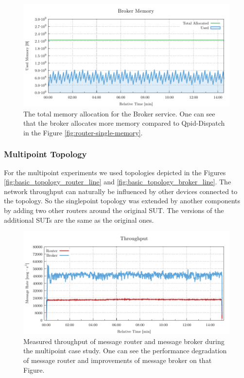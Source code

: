 \begin{figure}[H]
	\centering
	\includegraphics[width=1\linewidth]{obrazky-figures/charts/singlepoint-broker-throughput-memory.pdf}
	\caption{The total memory allocation for the Broker service. One can see that the broker allocates more memory compared to Qpid-Dispatch in the Figure \ref{fig:router-single-memory}.}
	\label{fig:broker-single-memory}
\end{figure}


\subsubsection*{Multipoint Topology}
For the multipoint experiments we used topologies depicted in the Figures \ref{fig:basic_topology_router_line} and \ref{fig:basic_topology_broker_line}. The network throughput can naturally be influenced by other devices connected to the topology. So the singlepoint topology was extended by another components by adding two other routers around the original SUT. The versions of the additional SUTs are the same as the original ones.

\begin{figure}[H]
	\centering
	\includegraphics[width=1\linewidth]{obrazky-figures/charts/multipoint-throughput.pdf}
	\caption{Measured throughput of message router and message broker during the multipoint case study. One can see the performance degradation of message router and improvements of message broker on that Figure.}
	\label{fig:rate-multipoint-router}
\end{figure}

